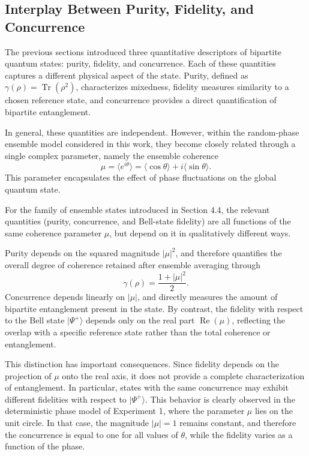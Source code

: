 \documentclass[a4paper]{article}
\begin{document}
\subsection{Interplay Between Purity, Fidelity, and Concurrence}

The previous sections introduced three quantitative descriptors of bipartite quantum states: purity, fidelity, and concurrence. Each of these quantities captures a different physical aspect of the state. Purity, defined as \(\gamma(\rho)=\operatorname{Tr}(\rho^2)\), characterizes mixedness, fidelity measures similarity to a chosen reference state, and concurrence provides a direct quantification of bipartite entanglement.

In general, these quantities are independent. However, within the random-phase ensemble model considered in this work, they become closely related through a single complex parameter, namely the ensemble coherence
\[
\mu = \langle e^{i\theta} \rangle
=
\langle \cos\theta \rangle + i \langle \sin\theta \rangle.
\]
This parameter encapsulates the effect of phase fluctuations on the global quantum state.

\medskip

For the family of ensemble states introduced in Section 4.4, the relevant quantities
(purity, concurrence, and Bell-state fidelity) are all functions of the same coherence
parameter \(\mu\), but depend on it in qualitatively different ways.

\medskip

Purity depends on the squared magnitude \( |\mu|^2 \), and therefore quantifies the overall degree of coherence retained after ensemble averaging through
\[
\gamma(\rho) = \frac{1 + |\mu|^2}{2}.
\]
Concurrence depends linearly on \( |\mu| \), and directly measures the amount of bipartite entanglement present in the state. By contrast, the fidelity with respect to the Bell state \( |\Psi^+\rangle \) depends only on the real part \( \operatorname{Re}(\mu) \), reflecting the overlap with a specific reference state rather than the total coherence or entanglement.

\medskip

This distinction has important consequences. Since fidelity depends on the projection of \(\mu\) onto the real axis, it does not provide a complete characterization of entanglement. In particular, states with the same concurrence may exhibit different fidelities with respect to \( |\Psi^+\rangle \). This behavior is clearly observed in the deterministic phase model of Experiment 1, where the parameter \(\mu\) lies on the unit circle. In that case, the magnitude \( |\mu| = 1 \) remains constant, and therefore the concurrence is equal to one for all values of \(\theta\), while the fidelity varies as a function of the phase.
\end{document}
